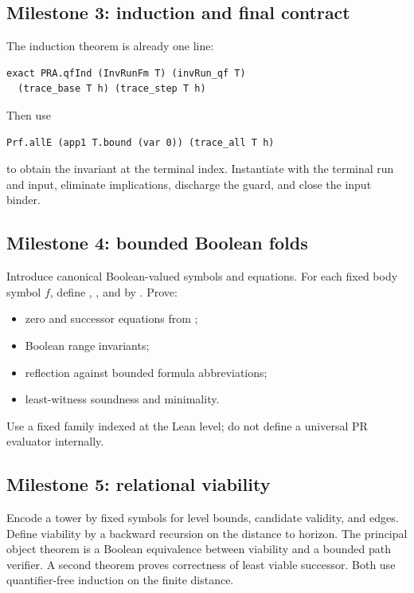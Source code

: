 \subsection{Milestone 3: induction and final contract}

The induction theorem is already one line:
\begin{lstlisting}[language=Lean]
exact PRA.qfInd (InvRunFm T) (invRun_qf T)
  (trace_base T h) (trace_step T h)
\end{lstlisting}
Then use
\begin{lstlisting}[language=Lean]
Prf.allE (app1 T.bound (var 0)) (trace_all T h)
\end{lstlisting}
to obtain the invariant at the terminal index.  Instantiate  with
the terminal run and input, eliminate implications, discharge the guard, and
close the input binder.

\subsection{Milestone 4: bounded Boolean folds}

Introduce canonical Boolean-valued symbols and equations.  For each fixed body
symbol \(f\), define , , and
 by .  Prove:
\begin{itemize}
\item zero and successor equations from ;
\item Boolean range invariants;
\item reflection against bounded formula abbreviations;
\item least-witness soundness and minimality.
\end{itemize}
Use a fixed family indexed at the Lean level; do not define a universal PR
evaluator internally.

\subsection{Milestone 5: relational viability}

Encode a tower by fixed symbols for level bounds, candidate validity, and
edges.  Define viability by a backward recursion on the distance to horizon.
The principal object theorem is a Boolean equivalence between viability and a
bounded path verifier.  A second theorem proves correctness of least viable
successor.  Both use quantifier-free induction on the finite distance.

